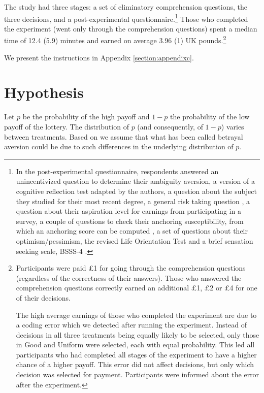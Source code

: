 The study had three stages: a set of eliminatory comprehension questions, the three decisions, and a post-experimental questionnaire.\footnote{
In the post-experimental questionnaire, respondents answered an unincentivized question to determine their ambiguity aversion, a version of a cognitive reflection test \citep{Frederick2005,Thomson2016} adapted by the authors, a question about the subject they studied for their most recent degree, a general risk taking question \citep{Dohmen2011}, a question about their aspiration level for earnings from participating in a survey, a couple of questions to check their anchoring susceptibility, from which an anchoring score can be computed \citep{Cheek2017}, a set of questions about their optimism/pessimism, the revised Life Orientation Test \citep{Scheier1994} and a brief sensation seeking scale, BSSS-4 \citep{Stephenson2003}.
}
Those who completed the experiment (went only through the comprehension questions) spent a median time of 12.4 (5.9) minutes and earned on average 3.96 (1) UK pounds.\footnote{
Participants were paid \pounds1 for going through the comprehension questions (regardless of the correctness of their answers).
Those who answered the comprehension questions correctly earned an additional \pounds1, \pounds2 or \pounds4 for one of their decisions.

The high average earnings of those who completed the experiment are due to a coding error which we detected after running the experiment.
Instead of decisions in all three treatments being equally likely to be selected, only those in Good and Uniform were selected, each with equal probability.
This led all participants who had completed all stages of the experiment to have a higher chance of a higher payoff.
This error did not affect decisions, but only which decision was selected for payment.
Participants were informed about the error after the experiment.
}

We present the instructions in Appendix \ref{section:appendixc}.


\section{Hypothesis}\label{sec:hyp}
Let $p$ be the probability of the high payoff and $1-p$ the probability of the low payoff of the lottery.
The distribution of $p$ (and consequently, of $1-p$) varies between treatments.
Based on \cite{Li2020a} we assume that what has been called betrayal aversion could be due to such differences in the underlying distribution of $p$.


